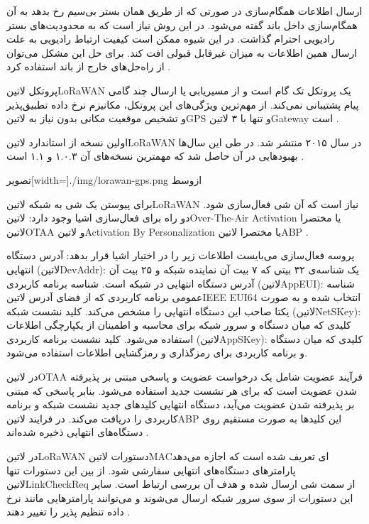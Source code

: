 ارسال اطلاعات همگام‌سازی در صورتی که از طریق همان بستر بی‌سیم رخ بدهد به آن همگام‌سازی داخل باند گفته می‌شود. در این روش نیاز است که به محدودیت‌های بستر رادیویی احترام گذاشت.
در این شیوه ممکن است کیفیت ارتباط رادیویی به علت ارسال همین اطلاعات به میزان غیرقابل قبولی افت کند. برای حل این مشکل می‌توان از راه‌حل‌های خارج از باند استفاده کرد
.

پروتکل ‌لاتین{LoRaWAN} یک پروتکل تک گام است و از مسیریابی یا ارسال چند گامی پیام پشتیبانی نمی‌کند. از مهم‌ترین ویژگی‌های این پروتکل، مکانیزم نرخ داده تطبیق‌پذیر و تشخیص
موقعیت مکانی بدون نیاز به ‌لاتین{GPS} و تنها با ۳ ‌لاتین{Gateway} است
.

اولین نسخه از استاندارد ‌لاتین{LoRaWAN} در سال ۲۰۱۵ منتشر شد. در طی این سال‌ها بهبودهایی در آن حاصل شد که مهمترین نسخه‌های آن ۱.۰.۳ و ۱.۱ است
.

‌تصویر[width=\textwidth]{./img/lorawan-gps.png}
‌ازوسط

برای پیوستن یک شی به شبکه ‌لاتین{LoRaWAN} نیاز است که آن شی فعال‌سازی شود. دو راه برای فعال‌سازی اشیا وجود دارد: ‌لاتین{Over-The-Air Activation} یا مختصرا ‌لاتین{OTAA}
و ‌لاتین{Activation By Personalization} یا مختصرا ‌لاتین{ABP}
.

پروسه فعال‌سازی می‌بایست اطلاعات زیر را در اختیار اشیا قرار بدهد:
 آدرس دستگاه انتهایی (‌لاتین{DevAddr}): یک شناسه‌ی ۳۲ بیتی که ۷ بیت آن نماینده شبکه و ۲۵ بیت آن آدرس دستگاه انتهایی در شبکه است.
 شناسه برنامه کاربردی (‌لاتین{AppEUI}): شناسه عمومی برنامه کاربردی که از فضای آدرس ‌لاتین{IEEE EUI64} انتخاب شده و به صورت یکتا صاحب این دستگاه انتهایی را مشخص می‌کند.
 کلید نشست شبکه (‌لاتین{NetSKey}): کلیدی که میان دستگاه و سرور شبکه برای محاسبه و اطمینان از یکپارچگی اطلاعات استفاده می‌شود.
 کلید نشست برنامه کاربردی (‌لاتین{AppSKey}): کلیدی که میان دستگاه و برنامه کاربردی برای رمزگذاری و رمزگشایی اطلاعات استفاده می‌شود.

در ‌لاتین{OTAA} فرآیند عضویت شامل یک درخواست عضویت و پاسخی مبتنی بر پذیرفته شدن عضویت است که برای هر نشست جدید استفاده می‌شود.
بنابر پاسخی که مبتنی بر پذیرفته شدن عضویت می‌آید، دستگاه انتهایی کلیدهای جدید نشست شبکه و برنامه کاربردی را دریافت می‌کند.
در فرایند ‌لاتین{ABP} این کلیدها به صورت مستقیم روی دستگاه‌های انتهایی ذخیره شده‌اند
.

در ‌لاتین{LoRaWAN} دستورات ‌لاتین{MAC}ای تعریف شده است که اجازه می‌دهد پارامترهای دستگاه‌های انتهایی سفارشی شود.
از بین این دستورات تنها ‌لاتین{LinkCheckReq} از سمت شی ارسال شده و هدف آن بررسی ارتباط است.
سایر این دستورات از سوی سرور شبکه ارسال می‌شوند و می‌توانند پارامترهایی مانند نرخ داده تنظیم پذیر را تغییر دهند
.

